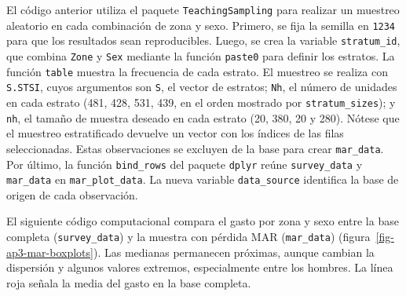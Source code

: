 \documentclass[
  spanish,
  11pt,
  letterpaper,
  oneside,
  open=any]{scrbook}
\newenvironment{Shaded}{\begin{snugshade}}{\end{snugshade}}
\newcommand{\AttributeTok}[1]{\textcolor[rgb]{0.40,0.45,0.13}{#1}}
\newcommand{\FunctionTok}[1]{\textcolor[rgb]{0.28,0.35,0.67}{#1}}
\newcommand{\NormalTok}[1]{\textcolor[rgb]{0.00,0.23,0.31}{#1}}
\newcommand{\OtherTok}[1]{\textcolor[rgb]{0.00,0.23,0.31}{#1}}
\newcommand{\SpecialCharTok}[1]{\textcolor[rgb]{0.37,0.37,0.37}{#1}}
\newcommand{\StringTok}[1]{\textcolor[rgb]{0.13,0.47,0.30}{#1}}
\begin{document}
El código anterior utiliza el paquete \texttt{TeachingSampling} para
realizar un muestreo aleatorio en cada combinación de zona y sexo.
Primero, se fija la semilla en \texttt{1234} para que los resultados
sean reproducibles. Luego, se crea la variable \texttt{stratum\_id}, que
combina \texttt{Zone} y \texttt{Sex} mediante la función \texttt{paste0}
para definir los estratos. La función \texttt{table} muestra la
frecuencia de cada estrato. El muestreo se realiza con \texttt{S.STSI},
cuyos argumentos son \texttt{S}, el vector de estratos; \texttt{Nh}, el
número de unidades en cada estrato (481, 428, 531, 439, en el orden
mostrado por \texttt{stratum\_sizes}); y \texttt{nh}, el tamaño de
muestra deseado en cada estrato (20, 380, 20 y 280). Nótese que el
muestreo estratificado devuelve un vector con los índices de las filas
seleccionadas. Estas observaciones se excluyen de la base para crear
\texttt{mar\_data}. Por último, la función \texttt{bind\_rows} del
paquete \texttt{dplyr} reúne \texttt{survey\_data} y \texttt{mar\_data}
en \texttt{mar\_plot\_data}. La nueva variable \texttt{data\_source}
identifica la base de origen de cada observación.

El siguiente código computacional compara el gasto por zona y sexo entre
la base completa (\texttt{survey\_data}) y la muestra con pérdida MAR
(\texttt{mar\_data}) (figura~\ref{fig-ap3-mar-boxplots}). Las medianas
permanecen próximas, aunque cambian la dispersión y algunos valores
extremos, especialmente entre los hombres. La línea roja señala la media
del gasto en la base completa.

\begin{Shaded}
\end{Shaded}
\end{document}

